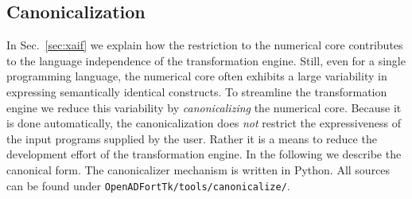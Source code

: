 \documentclass{book}
\newcommand{\refsec}[1]{{Sec.~\ref{#1}}}
\begin{document}
\subsection{Canonicalization}\label{sec:Canonicalization}
In \refsec{sec:xaif} we explain how the restriction to the numerical core 
contributes to the  language independence of the transformation
engine.
Still, even for a single programming language, the numerical 
core often exhibits a large variability in expressing semantically 
identical constructs. 
To streamline the transformation engine we reduce this variability by 
{\em canonicalizing} the numerical core. 
Because it is done automatically, the canonicalization does \emph{not} 
restrict the expressiveness of the input programs supplied by the user.
Rather it is a means to reduce the development effort of the transformation engine. 
In the following we describe the canonical form. The canonicalizer mechanism is written 
in Python. All sources can be found under \lstinline{OpenADFortTk/tools/canonicalize/}.
\end{document}
